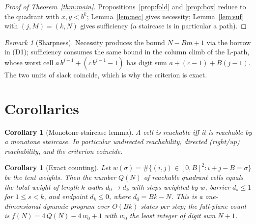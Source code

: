 \documentclass[11pt]{article}
\newtheorem{corollary}[theorem]{Corollary}
\theoremstyle{remark}
\newtheorem{remark}[theorem]{Remark}
\begin{document}
\begin{proof}[Proof of Theorem~\ref{thm:main}]
Propositions~\ref{prop:fold} and \ref{prop:box} reduce to the quadrant with
$x,y<b^k$; Lemma~\ref{lem:nec} gives necessity; Lemma~\ref{lem:suf} with
$(j,M)=(k,N)$ gives sufficiency (a staircase is in particular a path).
\end{proof}

\begin{remark}[Sharpness]
Necessity produces the bound $N-Bm+1$ via the borrow in (D1); sufficiency consumes
the same bound in the column climb of the L-path, whose worst cell
$a\,b^{j-1}+(c\,b^{j-1}-1)$ has digit sum $a+(c-1)+B(j-1)$. The two units of slack
coincide, which is why the criterion is exact.
\end{remark}

\section{Corollaries}

\begin{corollary}[Monotone-staircase lemma]
A cell is reachable iff it is reachable by a monotone staircase. In particular
undirected reachability, directed (right/up) reachability, and the criterion
coincide.
\end{corollary}

\begin{corollary}[Exact counting]\label{cor:count}
Let $w(\sigma)=\#\{(i,j)\in[0,B]^2 : i+j-B=\sigma\}$ be the tent weights. Then the
number $Q(N)$ of reachable quadrant cells equals the total weight of length-$k$
walks $d_0\to d_k$ with steps weighted by $w$, barrier $d_s\le 1$ for $1\le s<k$,
and endpoint $d_k\le 0$, where $d_0=Bk-N$. This is a one-dimensional dynamic
program over $O(Bk)$ states per step; the full-plane count is
$f(N)=4\,Q(N)-4\,w_0+1$ with $w_0$ the least integer of digit sum $N+1$.
\end{corollary}
\end{document}
